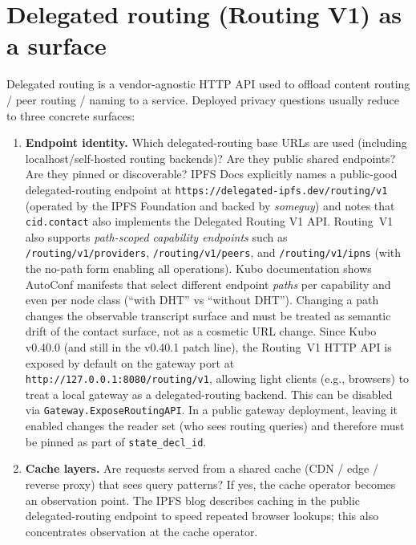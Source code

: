 \documentclass[11pt]{article}
\begin{document}
\section{Delegated routing (Routing V1) as a surface}
Delegated routing is a vendor-agnostic HTTP API used to offload content routing / peer routing / naming to a service.\cite{ipfsDelegatedRoutingV1Spec,ipip0337}
Deployed privacy questions usually reduce to three concrete surfaces:

\begin{enumerate}[leftmargin=*]
\item \textbf{Endpoint identity.} Which delegated-routing base URLs are used (including localhost/self-hosted routing backends)? Are they public shared endpoints? Are they pinned or discoverable?
IPFS Docs explicitly names a public-good delegated-routing endpoint at \texttt{https://delegated-ipfs.dev/routing/v1} (operated by the IPFS Foundation and backed by \emph{someguy}) and notes that \texttt{cid.contact} also implements the Delegated Routing V1 API.\cite{ipfsDocsNodes}
Routing~V1 also supports \emph{path-scoped capability endpoints} such as \texttt{/routing/v1/providers}, \texttt{/routing/v1/peers}, and \texttt{/routing/v1/ipns} (with the no-path form enabling all operations). Kubo documentation shows AutoConf manifests that select different endpoint \emph{paths} per capability and even per node class (``with DHT'' vs ``without DHT''). Changing a path changes the observable transcript surface and must be treated as semantic drift of the contact surface, not as a cosmetic URL change.\cite{kuboConfigPathRouting,ipfsDelegatedRoutingV1Spec}
Since Kubo v0.40.0 (and still in the v0.40.1 patch line), the Routing~V1 HTTP API is exposed by default on the gateway port at \texttt{http://127.0.0.1:8080/routing/v1}, allowing light clients (e.g., browsers) to treat a local gateway as a delegated-routing backend.\cite{kuboReleaseV040,kuboReleaseV0401}
This can be disabled via \texttt{Gateway.ExposeRoutingAPI}. In a public gateway deployment, leaving it enabled changes the reader set (who sees routing queries) and therefore must be pinned as part of \texttt{state\_decl\_id}.\cite{kuboConfigExposeRoutingAPI}
\item \textbf{Cache layers.} Are requests served from a shared cache (CDN / edge / reverse proxy) that sees query patterns? If yes, the cache operator becomes an observation point.
The IPFS blog describes caching in the public delegated-routing endpoint to speed repeated browser lookups; this also concentrates observation at the cache operator.\cite{blogDelegatedRoutingCaching2025}

\end{enumerate}
\end{document}
